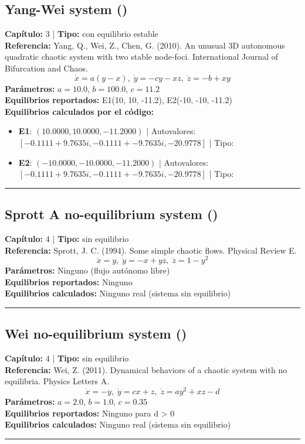 \subsection*{Yang-Wei system ()}
\textbf{Capítulo:} 3 | \textbf{Tipo:} con equilibrio estable\\
\textbf{Referencia:} Yang, Q., Wei, Z., Chen, G. (2010). An unusual 3D autonomous quadratic chaotic system with two stable node-foci. International Journal of Bifurcation and Chaos.\\
\[\dot{x}=a(y-x), \; \dot{y}=-cy-xz, \; \dot{z}=-b+xy\]
\textbf{Parámetros:} $a = 10.0$, $b = 100.0$, $c = 11.2$\\
\textbf{Equilibrios reportados:} E1(10, 10, -11.2), E2(-10, -10, -11.2)\\
\textbf{Equilibrios calculados por el código:}
\begin{itemize}
  \item \textbf{E1}: $(10.0000, 10.0000, -11.2000)$ | Autovalores: $[-0.1111 + 9.7635i, -0.1111 + -9.7635i, -20.9778]$ | Tipo: 
  \item \textbf{E2}: $(-10.0000, -10.0000, -11.2000)$ | Autovalores: $[-0.1111 + 9.7635i, -0.1111 + -9.7635i, -20.9778]$ | Tipo: 
\end{itemize}
\hrule

\subsection*{Sprott A no-equilibrium system ()}
\textbf{Capítulo:} 4 | \textbf{Tipo:} sin equilibrio\\
\textbf{Referencia:} Sprott, J. C. (1994). Some simple chaotic flows. Physical Review E.\\
\[\dot{x}=y, \; \dot{y}=-x+yz, \; \dot{z}=1-y^2\]
\textbf{Parámetros:} Ninguno (flujo autónomo libre)\\
\textbf{Equilibrios reportados:} Ninguno\\
\textbf{Equilibrios calculados:} Ninguno real (sistema sin equilibrio)\\
\hrule

\subsection*{Wei no-equilibrium system ()}
\textbf{Capítulo:} 4 | \textbf{Tipo:} sin equilibrio\\
\textbf{Referencia:} Wei, Z. (2011). Dynamical behaviors of a chaotic system with no equilibria. Physics Letters A.\\
\[\dot{x}=-y, \; \dot{y}=cx+z, \; \dot{z}=ay^2+xz-d\]
\textbf{Parámetros:} $a = 2.0$, $b = 1.0$, $c = 0.35$\\
\textbf{Equilibrios reportados:} Ninguno para d > 0\\
\textbf{Equilibrios calculados:} Ninguno real (sistema sin equilibrio)\\
\hrule

